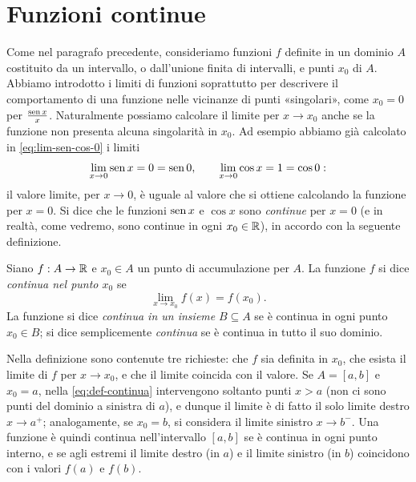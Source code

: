 \section{Funzioni continue}
\label{sec:continue}

Come nel paragrafo precedente, consideriamo funzioni $f$ definite in un dominio $A$
costituito da un intervallo, o dall'unione finita di intervalli, e punti $x_{0}$ di $A$.
Abbiamo introdotto i limiti di funzioni soprattutto per descrivere il comportamento di
una funzione nelle vicinanze di punti «singolari», come $x_{0}=0$ per $\frac{\operatorname{sen} x}{x}$.
Naturalmente possiamo calcolare il limite per $x\to x_{0}$ anche se la funzione non
presenta alcuna singolarità in $x_{0}$. Ad esempio abbiamo già calcolato in
\eqref{eq:lim-sen-cos-0} i limiti
\begin{equation}\label{eq:sen-cos-in-0}
  \lim_{x\to0}\operatorname{sen} x=0=\operatorname{sen}0, \qquad \lim_{x\to0}\cos x=1=\cos0:
\end{equation}
il valore limite, per $x\to0$, è uguale al valore che si ottiene calcolando la funzione
per $x=0$. Si dice che le funzioni $\operatorname{sen} x$ e $\cos x$ sono \emph{continue} per $x=0$ (e
in realtà, come vedremo, sono continue in ogni $x_{0}\in\mathbb{R}$), in accordo con la seguente
definizione.

\begin{definizione}\label{def:continua}
Siano $f:A\to\mathbb{R}$ e $x_{0}\in A$ un punto di accumulazione per $A$. La funzione $f$ si
dice \emph{continua nel punto $x_{0}$} se
\begin{equation}\label{eq:def-continua}
  \lim_{x\to x_{0}}f(x)=f(x_{0}) .
\end{equation}
La funzione si dice \emph{continua in un insieme} $B\subseteq A$ se è continua in ogni
punto $x_{0}\in B$; si dice semplicemente \emph{continua} se è continua in tutto il suo
dominio.
\end{definizione}

Nella definizione sono contenute tre richieste: che $f$ sia definita in $x_{0}$, che
esista il limite di $f$ per $x\to x_{0}$, e che il limite coincida con il valore. Se
$A=[a,b]$ e $x_{0}=a$, nella \eqref{eq:def-continua} intervengono soltanto punti $x>a$
(non ci sono punti del dominio a sinistra di $a$), e dunque il limite è di fatto il solo
limite destro $x\to a^{+}$; analogamente, se $x_{0}=b$, si considera il limite sinistro
$x\to b^{-}$. Una funzione è quindi continua nell'intervallo $[a,b]$ se è continua in ogni
punto interno, e se agli estremi il limite destro (in $a$) e il limite sinistro (in $b$)
coincidono con i valori $f(a)$ e $f(b)$.

